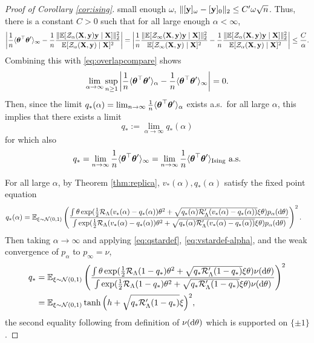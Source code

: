 \begin{proof}[Proof of Corollary \ref{cor:ising}]
small enough $\omega$, $\|[\mathbf{y}]_\omega-[\mathbf{y}]_0\|_2 \leq C'\omega\sqrt{n}$.
Thus, there is a constant $C>0$ such that for all large enough
$\alpha<\infty$,
\[\left|\frac{1}{n}\langle \boldsymbol{\theta}^\top \boldsymbol{\theta}' \rangle_\infty
-\frac{1}{n}\frac{\|\mathbb{E}[\mathcal{Z}_\alpha(\mathbf{X},\mathbf{y})\mathbf{y} \mid \mathbf{X}]\|_2^2}
{\mathbb{E}[\mathcal{Z}_\alpha(\mathbf{X},\mathbf{y}) \mid \mathbf{X}]^2}\right|
=\left|\frac{1}{n}\frac{\|\mathbb{E}[\mathcal{Z}_\infty(\mathbf{X},\mathbf{y})\mathbf{y} \mid \mathbf{X}]\|_2^2}
{\mathbb{E}[\mathcal{Z}_\infty(\mathbf{X},\mathbf{y}) \mid \mathbf{X}]^2}
-\frac{1}{n}\frac{\|\mathbb{E}[\mathcal{Z}_\alpha(\mathbf{X},\mathbf{y})\mathbf{y} \mid \mathbf{X}]\|_2^2}
{\mathbb{E}[\mathcal{Z}_\alpha(\mathbf{X},\mathbf{y}) \mid \mathbf{X}]^2}\right|
\leq \frac{C}{\alpha}.\]
Combining this with \eqref{eq:overlapcompare} shows
\[\lim_{\alpha \to \infty}
\sup_{n \geq 1}\left|\frac{1}{n}\langle \boldsymbol{\theta}^\top \boldsymbol{\theta}' \rangle_\alpha
-\frac{1}{n}\langle \boldsymbol{\theta}^\top \boldsymbol{\theta}' \rangle_\infty\right|=0.\]
Then, since the limit
$q_*(\alpha)=\lim_{n \to \infty} \frac{1}{n}\langle \boldsymbol{\theta}^\top
\boldsymbol{\theta}' \rangle_\alpha$ exists a.s.\ for all large $\alpha$,
this implies that there exists a limit
\begin{equation}\label{eq:vstardef-alpha}
q_*:=\lim_{\alpha \to \infty} q_*(\alpha)
\end{equation}
for which also
\[q_*=\lim_{n \to \infty} \frac{1}{n}\langle \boldsymbol{\theta}^\top \boldsymbol{\theta}'
\rangle_\infty
=\lim_{n \to \infty}
\frac{1}{n}\langle \boldsymbol{\theta}^\top \boldsymbol{\theta}'
\rangle_\text{Ising}\text{ a.s.}\]

For all large $\alpha$, by Theorem \ref{thm:replica},
$v_*(\alpha),q_*(\alpha)$ satisfy the fixed point equation
\begin{align*}
q_*(\alpha)&=\mathbb{E}_{\xi \sim \mathcal{N}(0,1)}
\left(\frac{\int \theta
\exp(\frac{1}{2}\mathcal{R}_\Lambda(v_*(\alpha)-q_*(\alpha))\theta^2
+\sqrt{q_*(\alpha)\mathcal{R}_\Lambda'(v_*(\alpha)-q_*(\alpha))}\xi\theta)p_\alpha(\mathrm{d}\theta)}
{\int
\exp(\frac{1}{2}\mathcal{R}_\Lambda(v_*(\alpha)-q_*(\alpha))\theta^2
+\sqrt{q_*(\alpha)\mathcal{R}_\Lambda'(v_*(\alpha)-q_*(\alpha))}\xi\theta)p_\alpha(\mathrm{d}\theta)}\right)^2.
\end{align*}
Then taking $\alpha \to \infty$ and applying
 \eqref{eq:qstardef}, \eqref{eq:vstardef-alpha}, and the weak convergence of 
$p_\alpha$ to $p_\infty=\nu$,
\begin{align*}
q_*&=\mathbb{E}_{\xi \sim \mathcal{N}(0,1)}
\left(\frac{\int \theta
\exp(\frac{1}{2}\mathcal{R}_\Lambda(1-q_*)\theta^2+\sqrt{q_*\mathcal{R}_\Lambda'(1-q_*)}\xi\theta)
\nu(\mathrm{d}\theta)}{\int
\exp(\frac{1}{2}\mathcal{R}_\Lambda(1-q_*)\theta^2
+\sqrt{q_*\mathcal{R}_\Lambda'(1-q_*)}\xi\theta)\nu(\mathrm{d}\theta)}\right)^2\\
&=\mathbb{E}_{\xi \sim \mathcal{N}(0,1)}
\tanh\Big(h+\sqrt{q_*\mathcal{R}_\Lambda'(1-q_*)}\xi\Big)^2,
\end{align*}
the second equality following from definition of $\nu(\mathrm{d}\theta)$ which is
supported on $\{\pm 1\}$.


\end{proof}
